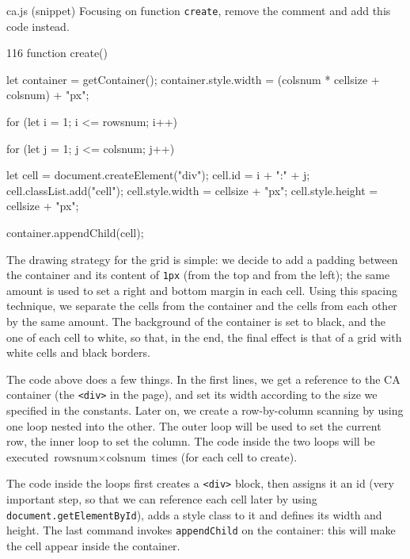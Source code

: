 \begin{programcode}{ca.js (snippet)}
Focusing on function \texttt{create}, remove the comment and add this code instead.
\begin{codeh1}{1}{16}
function create() {
  let container = getContainer();
  container.style.width = (colsnum * cellsize + colsnum) + "px";

  for (let i = 1; i <= rowsnum; i++) {
    for (let j = 1; j <= colsnum; j++) {
      let cell = document.createElement("div");
      cell.id = i + ":" + j;
      cell.classList.add("cell");
      cell.style.width = cellsize + "px";
      cell.style.height = cellsize + "px";

      container.appendChild(cell);
    }
  }
}
\end{codeh1}
\end{programcode}

%
\begin{marginfigure}
  
  \caption[Grid drawing strategy]{The drawing strategy for the grid
  is simple: we decide to add a padding between the container
  and its content of \texttt{1px} (from the top and from the left);
  the same amount is used to set a right and bottom margin in each cell. Using this spacing
  technique, we separate the cells from the container and the cells from each other by the same
  amount. The background of the container is set to black, and the one of each cell to white, so
  that, in the end, the final effect is that of a grid with white cells and black borders.}
  \label{fig:gridlayout}
\end{marginfigure}
%

The code above does a few things. In the first lines, we get a reference to the CA container
(the \texttt{<div>} in the page), and set its width according to the size we specified in the
constants. Later on, we create a row-by-column scanning by using one loop nested into the other.
The outer loop will be used to set the current row, the inner loop to set the column. The code
inside the two loops will be executed $\text{rowsnum} \times \text{colsnum}$ times
(for each cell to create).

The code inside the loops first creates a \texttt{<div>} block, then assigns it an id (very
important step, so that we can reference each cell later
by using \texttt{document.getElementById}), adds a style class to it and defines its width and height.
The last command invokes \texttt{appendChild} on the container: this will make the cell appear
inside the container.\\

